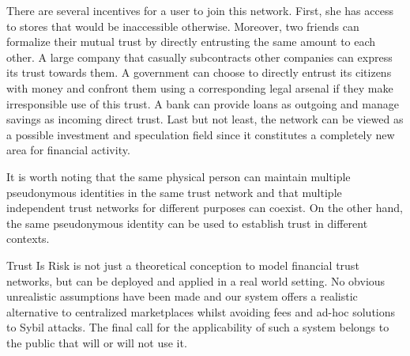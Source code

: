   There are several incentives for a user to join this network. First, she has access to stores that would be inaccessible
  otherwise. Moreover, two friends can formalize their mutual trust by directly entrusting the same amount to each other. A
  large company that casually subcontracts other companies can express its trust towards them. A government can choose to
  directly entrust its citizens with money and confront them using a corresponding legal arsenal if they make irresponsible
  use of this trust. A bank can provide loans as outgoing and manage savings as incoming direct trust. Last but not least,
  the network can be viewed as a possible investment and speculation field since it constitutes a completely new area for
  financial activity.

  It is worth noting that the same physical person can maintain multiple pseudonymous identities in the same trust network
  and that multiple independent trust networks for different purposes can coexist. On the other hand, the same pseudonymous
  identity can be used to establish trust in different contexts.
  
  Trust Is Risk is not just a theoretical conception to model financial trust networks, but can be deployed and applied in a
  real world setting. No obvious unrealistic assumptions have been made and our system offers a realistic alternative to
  centralized marketplaces whilst avoiding fees and ad-hoc solutions to Sybil attacks. The final call for the applicability of
  such a system belongs to the public that will or will not use it.

